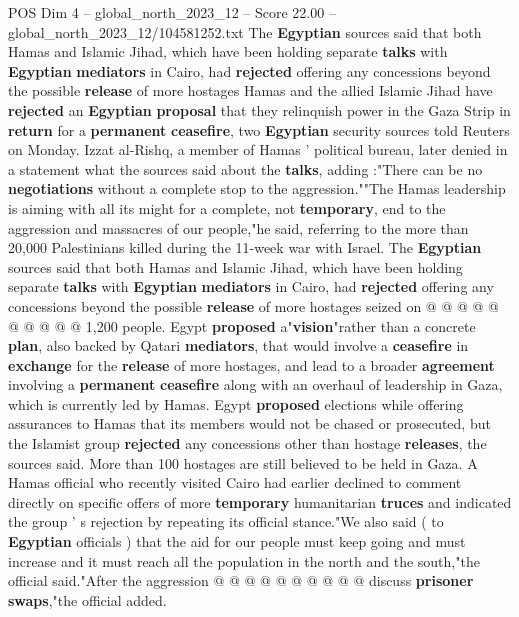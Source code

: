 \begin{textsample}{POS Dim 4 – global\_north\_2023\_12 – Score 22.00 – global\_north\_2023\_12/104581252.txt}  \label{ex:f4_pos_304}
The \textbf{Egyptian} sources said that both Hamas and Islamic Jihad, which have been holding separate \textbf{talks} with \textbf{Egyptian} \textbf{mediators} in Cairo, had \textbf{rejected} offering any concessions beyond the possible \textbf{release} of more hostages Hamas and the allied Islamic Jihad have \textbf{rejected} an \textbf{Egyptian} \textbf{proposal} that they relinquish power in the Gaza Strip in \textbf{return} for a \textbf{permanent} \textbf{ceasefire}, two \textbf{Egyptian} security sources told Reuters on Monday.
Izzat al-Rishq, a member of Hamas ' political bureau, later denied in a statement what the sources said about the \textbf{talks}, adding :"There can be no \textbf{negotiations} without a complete stop to the aggression.""The Hamas leadership is aiming with all its might for a complete, not \textbf{temporary}, end to the aggression and massacres of our people,"he said, referring to the more than 20,000 Palestinians killed during the 11-week war with Israel.
The \textbf{Egyptian} sources said that both Hamas and Islamic Jihad, which have been holding separate \textbf{talks} with \textbf{Egyptian} \textbf{mediators} in Cairo, had \textbf{rejected} offering any concessions beyond the possible \textbf{release} of more hostages seized on @ @ @ @ @ @ @ @ @ @ 1,200 people.
Egypt \textbf{proposed} a"\textbf{vision}"rather than a concrete \textbf{plan}, also backed by Qatari \textbf{mediators}, that would involve a \textbf{ceasefire} in \textbf{exchange} for the \textbf{release} of more hostages, and lead to a broader \textbf{agreement} involving a \textbf{permanent} \textbf{ceasefire} along with an overhaul of leadership in Gaza, which is currently led by Hamas.
Egypt \textbf{proposed} elections while offering assurances to Hamas that its members would not be chased or prosecuted, but the Islamist group \textbf{rejected} any concessions other than hostage \textbf{releases}, the sources said.
More than 100 hostages are still believed to be held in Gaza.
A Hamas official who recently visited Cairo had earlier declined to comment directly on specific offers of more \textbf{temporary} humanitarian \textbf{truces} and indicated the group ' s rejection by repeating its official stance."We also said ( to \textbf{Egyptian} officials ) that the aid for our people must keep going and must increase and it must reach all the population in the north and the south,"the official said."After the aggression @ @ @ @ @ @ @ @ @ @ discuss \textbf{prisoner} \textbf{swaps},"the official added.

\end{textsample}

